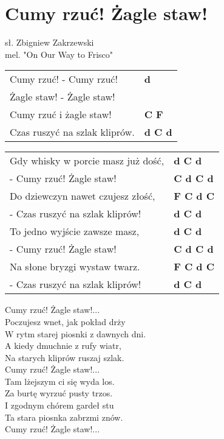 \section{Cumy rzuć! Żagle staw!}

sł. Zbigniew Zakrzewski\\
mel. "On Our Way to Frisco"\\

\vspace{2em}
\begin{tabular}{@{}p{7cm}@{}l@{}}
Cumy rzuć! - Cumy rzuć! & \bfseries d\\
Żagle staw! - Żagle staw! & \\
Cumy rzuć i żagle staw! & \bfseries C F\\
Czas ruszyć na szlak kliprów. & \bfseries d C d\\
\end{tabular}

\begin{tabular}{@{}p{7cm}@{}l@{}}
Gdy whisky w porcie masz już dość, & \bfseries d C d\\
- Cumy rzuć! Żagle staw! & \bfseries C d C d\\
Do dziewczyn nawet czujesz złość, & \bfseries F C d C\\
- Czas ruszyć na szlak kliprów! & \bfseries d C d\\
To jedno wyjście zawsze masz, & \bfseries d C d\\
- Cumy rzuć! Żagle staw! & \bfseries C d C d\\
Na słone bryzgi wystaw twarz. & \bfseries F C d C\\
- Czas ruszyć na szlak kliprów! & \bfseries d C d\\
\end{tabular}

\vspace{1em}
Cumy rzuć! Żagle staw!... \\

Poczujesz wnet, jak pokład drży \\
W rytm starej piosnki z dawnych dni. \\
A kiedy dmuchnie z rufy wiatr, \\
Na starych kliprów ruszaj szlak. \\

Cumy rzuć! Żagle staw!... \\

Tam lżejszym ci się wyda los. \\
Za burtę wyrzuć pusty trzos. \\
I zgodnym chórem gardeł stu \\
Ta stara piosnka zabrzmi znów. \\

Cumy rzuć! Żagle staw!...  \\